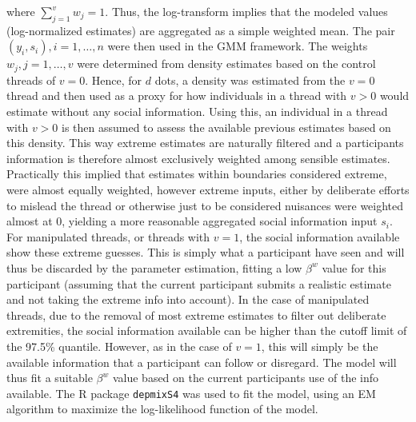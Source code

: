 \documentclass[9pt,a4paper,twocolumn,lineno]{article}
\begin{document}
where $\sum_{j=1}^v w_j = 1$. Thus, the log-transform implies that the modeled values (log-normalized estimates) are aggregated as a simple weighted mean. The pair $(y_i,s_i), i=1,\dots,n$ were then used in the GMM framework. The weights $w_j, j=1,\dots,v$ were determined from density estimates based on the control threads of $v=0$. Hence, for $d$ dots, a density was estimated from the $v=0$ thread and then used as a proxy for how individuals in a thread with $v>0$ would estimate without any social information. Using this, an individual in a thread with $v>0$ is then assumed to assess the available previous estimates based on this density. This way extreme estimates are naturally filtered and a participants information is therefore almost exclusively weighted among sensible estimates. Practically this implied that estimates within boundaries considered extreme, were almost equally weighted, however extreme inputs, either by deliberate efforts to mislead the thread or otherwise just to be considered nuisances were weighted almost at 0, yielding a more reasonable aggregated social information input $s_i$. For manipulated threads, or threads with $v=1$, the social information available show these extreme guesses. This is simply what a participant have seen and will thus be discarded by the parameter estimation, fitting a low $\beta^w$ value for this participant (assuming that the current participant submits a realistic estimate and not taking the extreme info into account). In the case of manipulated threads, due to the removal of most extreme estimates to filter out deliberate extremities, the social information available can be higher than the cutoff limit of the 97.5\% quantile. However, as in the case of $v=1$, this will simply be the available information that a participant can follow or disregard. The model will thus fit a suitable $\beta^w$ value based on the current participants use of the info available. The R package \texttt{depmixS4} \cite{visser2010} was used to fit the model, using an EM algorithm to maximize the log-likelihood function of the model.
\end{document}
